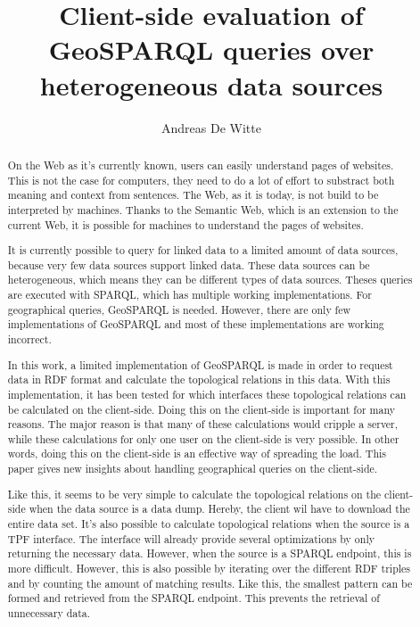 \documentclass[twocolumn]{phdsymp} %
\begin{document}
\title{Client-side evaluation of GeoSPARQL queries over heterogeneous data sources} %

\author{Andreas De Witte}


\maketitle

\begin{abstract}
    On the Web as it's currently known, users can easily understand pages of websites. This is not the case for computers, they need to do a lot of effort to substract both meaning and context from sentences. The Web, as it is today, is not build to be interpreted by machines. Thanks to the Semantic Web, which is an extension to the current Web, it is possible for machines to understand the pages of websites.

    It is currently possible to query for linked data to a limited amount of data sources, because very few data sources support linked data. These data sources can be heterogeneous, which means they can be different types of data sources. Theses queries are executed with SPARQL, which has multiple working implementations. For geographical queries, GeoSPARQL is needed. However, there are only few implementations of GeoSPARQL and most of these implementations are working incorrect.

    In this work, a limited implementation of GeoSPARQL is made in order to request data in RDF format and calculate the topological relations in this data. With this implementation, it has been tested for which interfaces these topological relations can be calculated on the client-side. Doing this on the client-side is important for many reasons. The major reason is that many of these calculations would cripple a server, while these calculations for only one user on the client-side is very possible. In other words, doing this on the client-side is an effective way of spreading the load. This paper gives new insights about handling geographical queries on the client-side.

    Like this, it seems to be very simple to calculate the topological relations on the client-side when the data source is a data dump. Hereby, the client wil have to download the entire data set. It's also possible to calculate topological relations when the source is a TPF interface. The interface will already provide several optimizations by only returning the necessary data. However, when the source is a SPARQL endpoint, this is more difficult. However, this is also possible by iterating over the different RDF triples and by counting the amount of matching results. Like this, the smallest pattern can be formed and retrieved from the SPARQL endpoint. This prevents the retrieval of unnecessary data.
    

\end{abstract}
\end{document}
